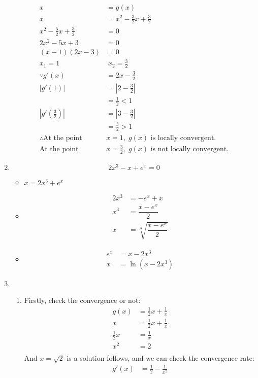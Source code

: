 \documentclass{article}
\begin{document}
\begin{enumerate}
 \begin{align*}
x &= g(x)\\
x &=  x^2-\frac{3}{2}x +\frac{3}{2}\\
x^2-\frac{5}{2}x +\frac{3}{2}&=0\\
2x^2-5x+3&=0\\
(x-1)(2x-3) &=0\\
x_1 = 1&\; x_2 = \frac{3}{2}\\
\because g'(x) &=2x-\frac{3}{2}\\
|g'(1)|&=\left|2-\frac{3}{2}\right|\\
&=\frac{1}{2} < 1\\
\left|g'\left(\frac{3}{2}\right)\right|&=\left|3-\frac{3}{2}\right|\\
&=\frac{3}{2} >1\\
\therefore \mbox{At the point } &x = 1,\; g(x) \mbox{ is locally convergent.}\\
 \mbox{At the point } &x = \frac{3}{2},\; g(x) \mbox{ is not locally convergent.}
\end{align*}
\item
\[2x^3 -x +e^x =0\]
\begin{itemize}
\item $x = 2x^3+e^x$
\item \begin{align*}
2x^3 &= -e^x +x\\
x^3&=\dfrac{x-e^x}{2}\\
x &=\sqrt[3]{\dfrac{x-e^x}{2}}
\end{align*}
\item \begin{align*}
e^x &=x-2x^3\\
x&= \ln(x - 2x^3)
\end{align*}
\end{itemize}
\item
\begin{enumerate}
\item
Firstly, check the convergence or not:
\begin{align*}
g(x) &= \frac{1}{2}x+\frac{1}{x}\\
x &= \frac{1}{2}x+\frac{1}{x}\\
\frac{1}{2}x &=\frac{1}{x}\\
x^2 &=2\\
\end{align*}
And $x = \sqrt{2}$ is a solution follows, and we can check the convergence rate:
\begin{align*}
g'(x) &= \frac{1}{2}-\frac{1}{x^2}\\

\end{align*}
\end{enumerate}
\end{enumerate}
\end{document}
